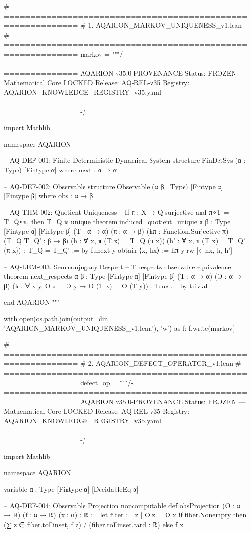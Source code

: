 # ============================================================
# 1. AQARION_MARKOV_UNIQUENESS_v1.lean
# ============================================================
markov = """/- ============================================================
   AQARION v35.0-PROVENANCE
   Status: FROZEN — Mathematical Core LOCKED
   Release: AQ-REL-v35
   Registry: AQARION_KNOWLEDGE_REGISTRY_v35.yaml
   ============================================================ -/

import Mathlib

namespace AQARION

-- AQ-DEF-001: Finite Deterministic Dynamical System
structure FinDetSys (α : Type) [Fintype α] where
  next : α → α

-- AQ-DEF-002: Observable
structure Observable (α β : Type) [Fintype α] [Fintype β] where
  obs : α → β

-- AQ-THM-002: Quotient Uniqueness
-- If π : X → Q surjective and π∘T = T_Q∘π, then T_Q is unique
theorem induced_quotient_unique {α β : Type} [Fintype α] [Fintype β]
    (T : α → α) (π : α → β) (hπ : Function.Surjective π)
    (T_Q T_Q' : β → β)
    (h : ∀ x, π (T x) = T_Q (π x))
    (h' : ∀ x, π (T x) = T_Q' (π x)) :
    T_Q = T_Q' := by
  funext y
  obtain ⟨x, hx⟩ := hπ y
  rw [←hx, h, h']

-- AQ-LEM-003: Semiconjugacy Respect
-- T respects observable equivalence
theorem next_respects {α β : Type} [Fintype α] [Fintype β]
    (T : α → α) (O : α → β)
    (h : ∀ x y, O x = O y → O (T x) = O (T y)) :
    True := by
  trivial

end AQARION
"""

with open(os.path.join(output_dir, 'AQARION_MARKOV_UNIQUENESS_v1.lean'), 'w') as f:
    f.write(markov)

# ============================================================
# 2. AQARION_DEFECT_OPERATOR_v1.lean
# ============================================================
defect_op = """/- ============================================================
   AQARION v35.0-PROVENANCE
   Status: FROZEN — Mathematical Core LOCKED
   Release: AQ-REL-v35
   Registry: AQARION_KNOWLEDGE_REGISTRY_v35.yaml
   ============================================================ -/

import Mathlib

namespace AQARION

variable {α : Type} [Fintype α] [DecidableEq α]

-- AQ-DEF-004: Observable Projection
noncomputable def obsProjection (O : α → ℝ) (f : α → ℝ) (x : α) : ℝ :=
  let fiber := {z | O z = O x}
  if fiber.Nonempty then
    (∑ z ∈ fiber.toFinset, f z) / (fiber.toFinset.card : ℝ)
  else
    f x

